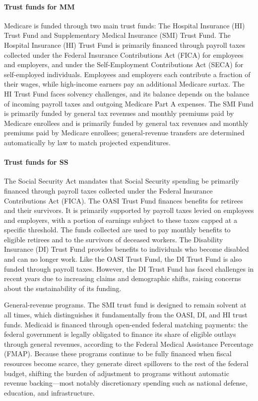 \documentclass[12pt]{article}%
\theoremstyle{remark}
\begin{document}
\paragraph{Trust funds for MM}

Medicare is funded through two main trust funds: The Hospital Insurance (HI) Trust Fund and Supplementary Medical Insurance (SMI) Trust Fund. The Hospital Insurance (HI) Trust Fund is primarily financed through payroll taxes collected under the Federal Insurance Contributions Act (FICA) for employees and employers, and under the Self-Employment Contributions Act (SECA) for self-employed individuals. Employees and employers each contribute a fraction of their wages, while high-income earners pay an additional Medicare surtax. The HI Trust Fund faces solvency challenges, and its balance depends on the balance of incoming payroll taxes and outgoing Medicare Part A expenses. The SMI Fund is primarily funded by general tax revenues and monthly premiums paid by Medicare enrollees and is primarily funded by general tax revenues and monthly premiums paid by Medicare enrollees; general-revenue transfers are determined automatically by law to match projected expenditures.
\paragraph{Trust funds for SS}
The Social Security Act mandates that Social Security spending be primarily financed through payroll taxes collected under the Federal Insurance Contributions Act (FICA). The OASI Trust Fund finances benefits for retirees and their survivors. It is primarily supported by payroll taxes levied on employees and employers, with a portion of earnings subject to these taxes capped at a specific threshold. The funds collected are used to pay monthly benefits to eligible retirees and to the survivors of deceased workers. The Disability Insurance (DI) Trust Fund provides benefits to individuals who become disabled and can no longer work. Like the OASI Trust Fund, the DI Trust Fund is also funded through payroll taxes. However, the DI Trust Fund has faced challenges in recent years due to increasing claims and demographic shifts, raising concerns about the sustainability of its funding.

General-revenue programs. The SMI trust fund is designed to remain solvent at all times, which distinguishes it fundamentally from the OASI, DI, and HI trust funds. Medicaid is financed through open-ended federal matching payments: the federal government is legally obligated to finance its share of eligible outlays through general revenues, according to the Federal Medical Assistance Percentage (FMAP). Because these programs continue to be fully financed when fiscal resources become scarce, they generate direct spillovers to the rest of the federal budget, shifting the burden of adjustment to programs without automatic revenue backing—most notably discretionary spending such as national defense, education, and infrastructure.
\end{document}
